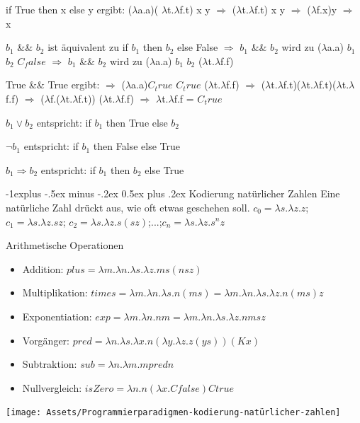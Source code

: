 \documentclass[10pt]{article}
\makeatletter
\renewcommand{\subsection}{\@startsection{subsection}{2}{0mm}%
                                {-1explus -.5ex minus -.2ex}%
                                {0.5ex plus .2ex}%
                                {\normalfont\normalsize\bfseries}}
\makeatother
\begin{document}
\begin{itemize*}
  \item if True then x else y ergibt:
  \subitem ($\lambda$\color{blue}a.a\color{black})(\color{red} $\lambda$t.$\lambda$f.t\color{black}) x y $\Rightarrow$ ($\lambda$\color{blue}t\color{black}.$\lambda$f.\color{blue}t\color{black}) \color{red}x\color{black} y $\Rightarrow$ ($\lambda$\color{blue}f\color{black}.x)\color{red}y\color{black} $\Rightarrow$ x
  \item $b_1$ \&\& $b_2$ ist äquivalent zu if $b_1$ then $b_2$ else False
  \subitem $\Rightarrow$  $b_1$ \&\& $b_2$ wird zu ($\lambda$a.a) $b_1$ $b_2$ $C_false$
  \subitem $\Rightarrow$  $b_1$ \&\& $b_2$ wird zu ($\lambda$a.a) $b_1$ $b_2$ ($\lambda$t.$\lambda$f.f)
  \item True \&\& True ergibt:
  \subitem \color{white} $\Rightarrow$ \color{black}($\lambda$\color{blue}a.a\color{black})\color{red}$C_true$ \color{black} $C_true$ ($\lambda$t.$\lambda$f.f)
  \subitem  $\Rightarrow$ ($\lambda$\color{blue}t\color{black}.$\lambda$f.\color{blue}t\color{black})\color{red}($\lambda$t.$\lambda$f.t)\color{black}($\lambda$t.$\lambda$f.f)
  \subitem $\Rightarrow$ ($\lambda$\color{blue}f\color{black}.($\lambda$t.$\lambda$f.t)) \color{red}($\lambda$t.$\lambda$f.f)\color{black} $\Rightarrow$ $\lambda$t.$\lambda$f.f = $C_true$
  \item $b_1 \lor b_2$ entspricht:
  \subitem if $b_1$ then True else $b_2$
  \item $\neg b_1$ entspricht:
  \subitem if $b_1$ then False else True
  \item $b_1 \Rightarrow b_2$ entspricht:
  \subitem if $b_1$ then $b_2$ else True
\end{itemize*}

\subsection{Kodierung natürlicher Zahlen}
Eine natürliche Zahl drückt aus, wie oft etwas geschehen soll.
$c_0 = \lambda s.\lambda z.z$; $c_1=\lambda s.\lambda z.sz$; $c_2=\lambda s.\lambda z.s(sz)$;...;$c_n=\lambda s.\lambda z.s^n z$

Arithmetische Operationen
\begin{itemize}
  \item Addition:   $plus = \lambda m. \lambda n. \lambda s. \lambda z. m s (n s z)$
  \item Multiplikation: $times = \lambda m. \lambda n. \lambda s. n (m s) = \lambda m. \lambda n. \lambda s. \lambda z. n (m s) z$
  \item Exponentiation: $exp = \lambda m. \lambda n. n m = \lambda m. \lambda n. \lambda s. \lambda z. n m s z$
  \item Vorgänger:  $pred = \lambda n.\lambda s.\lambda x. n (\lambda y.\lambda z. z (y s))(K x)$
  \item Subtraktion: $sub = \lambda n.\lambda m. m pred n$
  \item Nullvergleich: $isZero = \lambda n. n (\lambda x. C false ) C true$
\end{itemize}
\begin{center}
  \texttt{[image: Assets/Programmierparadigmen-kodierung-natürlicher-zahlen]}
\end{center}
\end{document}

